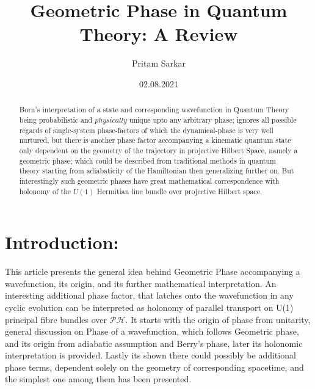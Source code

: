 \documentclass[8pt, twocoloumn]{article}
\title{\textbf{Geometric Phase in Quantum Theory: 
    A Review}}
\author[1]{Pritam Sarkar}
\affil[1]{Indian Association for the Cultivation of Science}
\date{02.08.2021}
\begin{document}
\newtheorem*{theorem}{Definition}
\newtheorem*{axiom1}{Axiom 1}
\newtheorem*{axiom4}{Axiom 4}
\newtheorem*{definition1}{Adiabatic Evolution}
\newcommand\sbullet[1][.5]{\mathbin{\vcenter{\hbox{\scalebox{#1}{$\bullet$}}}}}


\maketitle

\begin{abstract}
Born's interpretation of a state and corresponding wavefunction in Quantum Theory being probabilistic and $physically$ unique upto any arbitrary phase; ignores all possible regards of single-system phase-factors of which the dynamical-phase is very well nurtured, but there is another phase factor accompanying a kinematic quantum state only dependent on the geometry of the trajectory in projective Hilbert Space, namely a geometric phase; which could be described from traditional methods in quantum theory starting from adiabaticity of the Hamiltonian then generalizing further on. But interestingly such geometric phases have great mathematical correspondence with holonomy of the $U(1)$ Hermitian line bundle over projective Hilbert space. 
\end{abstract} 





\section{Introduction:}

This article presents the general idea behind Geometric Phase accompanying a wavefunction, its origin, and its further mathematical interpretation. An interesting additional phase factor, that latches onto the wavefunction in any cyclic evolution can be interpreted as holonomy of parallel transport on U(1) principal fibre bundles over $\mathcal{PH}$. It starts with the origin of phase from unitarity, general discussion on Phase of a wavefunction, which follows Geometric phase, and its origin from adiabatic assumption and Berry's phase, later its holonomic interpretation is provided. Lastly its shown there could possibly be additional phase terms, dependent solely on the geometry of corresponding spacetime, and the simplest one among them has been presented. 
\end{document}
